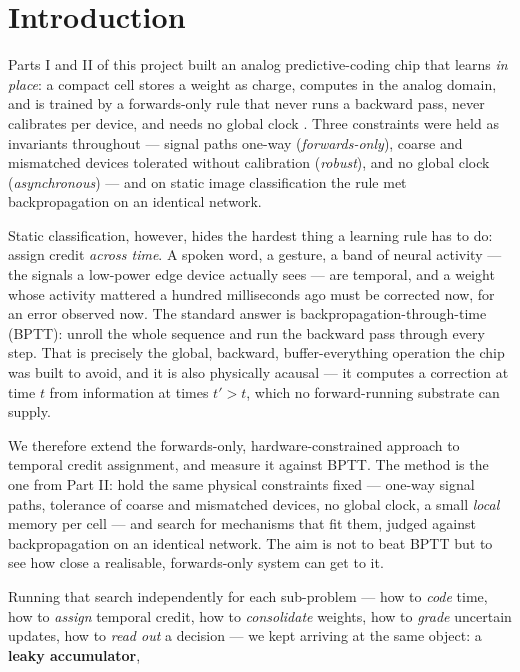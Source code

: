 \documentclass[11pt]{article}
\begin{document}
\hypertarget{sec:intro}{%
\section{Introduction}\label{sec:intro}}

Parts I and II of this project built an analog predictive-coding chip
that learns \emph{in place}: a compact cell stores a weight as charge,
computes in the analog domain, and is trained by a forwards-only rule
that never runs a backward pass, never calibrates per device, and needs
no global clock \cite{dobney2026analog, dobney2026forwards}. Three
constraints were held as invariants throughout --- signal paths one-way
(\emph{forwards-only}), coarse and mismatched devices tolerated without
calibration (\emph{robust}), and no global clock (\emph{asynchronous})
--- and on static image classification the rule met backpropagation on
an identical network.

Static classification, however, hides the hardest thing a learning rule
has to do: assign credit \emph{across time}. A spoken word, a gesture, a
band of neural activity --- the signals a low-power edge device actually
sees --- are temporal, and a weight whose activity mattered a hundred
milliseconds ago must be corrected now, for an error observed now. The
standard answer is backpropagation-through-time (BPTT): unroll the whole
sequence and run the backward pass through every step. That is precisely
the global, backward, buffer-everything operation the chip was built to
avoid, and it is also physically acausal --- it computes a correction at
time \(t\) from information at times \(t' > t\), which no
forward-running substrate can supply.

We therefore extend the forwards-only, hardware-constrained approach to
temporal credit assignment, and measure it against BPTT. The method is
the one from Part II: hold the same physical constraints fixed ---
one-way signal paths, tolerance of coarse and mismatched devices, no
global clock, a small \emph{local} memory per cell --- and search for
mechanisms that fit them, judged against backpropagation on an identical
network. The aim is not to beat BPTT but to see how close a realisable,
forwards-only system can get to it.

Running that search independently for each sub-problem --- how to
\emph{code} time, how to \emph{assign} temporal credit, how to
\emph{consolidate} weights, how to \emph{grade} uncertain updates, how
to \emph{read out} a decision --- we kept arriving at the same object: a
\textbf{leaky accumulator},
\end{document}
